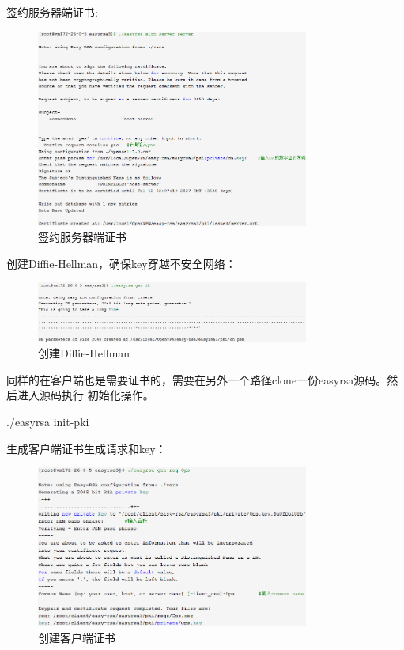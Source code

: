 \documentclass[a4paper,12pt]{report}
\begin{document}
\begin{spacing}{1.5}
签约服务器端证书:
\begin{figure}[H]
	\centering
	\includegraphics [width=0.8\textwidth]{figure//sign-server-ca.png}
	\caption{签约服务器端证书}\label{sign-server-ca}
\end{figure}

创建Diffie-Hellman，确保key穿越不安全网络：
\begin{figure}[H]
	\centering
	\includegraphics [width=0.8\textwidth]{figure//gen-dh.png}
	\caption{创建Diffie-Hellman}\label{gen-dh}
\end{figure}

同样的在客户端也是需要证书的，需要在另外一个路径clone一份easyrsa源码。然后进入源码执行
初始化操作。
\begin{tcolorbox}[notitle,boxrule=0pt,colback=gray!20,colframe=gray!20]
./easyrsa init-pki
\end{tcolorbox}

生成客户端证书生成请求和key：
\begin{figure}[hbtp]
	\centering
	\includegraphics [width=0.8\textwidth]{figure//client-ca.png}
	\caption{创建客户端证书}\label{client-ca}
\end{figure}


\end{spacing}
\end{document}
